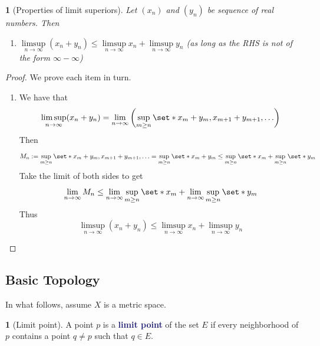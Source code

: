 \documentclass[12pt]{article}
\numberwithin{equation}{section}
\newcommand{\navy}[1]{\textcolor{MidnightBlue}{\bf #1}}
\theoremstyle{plain}
\newtheorem{theorem}{\color{ForestGreen}{\textbf{Theorem}}}[section]
\theoremstyle{definition}
\newtheorem{definition}{\color{MidnightBlue}{\textbf{Definition}}}[section]
\newcommand\parens[1]{\left( #1 \right)}
\def\Set{\set*}%
\newcommand{\1}{\mathbbm 1}
\begin{document}
\begin{theorem}[Properties of limit superiors]
	Let $\parens{x_n}$ and $\parens{y_n}$ be sequence of real numbers. Then
	\begin{enumerate}
		\item $\limsup\limits_{n \to \infty}(x_n + y_n) \leq \limsup\limits_{n \to \infty} x_n + \limsup\limits_{n \to \infty} y_n$ (as long as the RHS is not of the form $\infty - \infty$)
	\end{enumerate}
\end{theorem}
\begin{proof}
	We prove each item in turn.
	\begin{enumerate}
		\item We have that
		\begin{equation}
			\limsup\limits_{n \to \infty}(x_n + y_n) = \lim_{n \to \infty}\parens{\sup_{m \geq n}\Set{x_m + y_m, x_{m+1} + y_{m+1}, \ldots}}
		\end{equation}
		Then 
		\begin{equation}
			M_n := \sup_{m \geq n}\Set{x_m + y_m, x_{m+1} + y_{m+1}, \ldots} = \sup_{m \geq n}\Set{x_m + y_m} \leq \sup_{m \geq n}\Set{x_m} + \sup_{m \geq n}\Set{y_m}
		\end{equation}
		Take the limit of both sides to get
		\begin{equation}
			\lim_{n \to \infty} M_n \leq \lim_{n \to \infty} \sup_{m \geq n} \Set{x_m} + \lim_{n \to \infty} \sup_{m \geq n} \Set{y_m}
		\end{equation}
		Thus 
		\begin{equation}
			\limsup\limits_{n \to \infty}(x_n + y_n) \leq \limsup\limits_{n \to \infty} x_n + \limsup\limits_{n \to \infty} y_n
		\end{equation}
	\end{enumerate}
\end{proof}



\subsection{Basic Topology}

In what follows, assume $X$ is a metric space. 

\begin{definition}[Limit point]
	A point $p$ is a \navy{limit point} of the set $E$ if every neighborhood of $p$ contains a point $q \neq p$ such that $q \in E$.
\end{definition}
\end{document}
